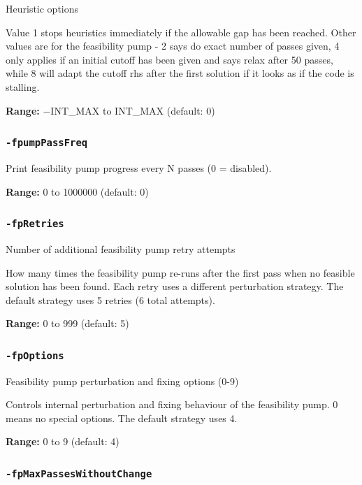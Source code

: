 \documentclass[11pt,a4paper]{article}
\begin{document}
Heuristic options

Value 1 stops heuristics immediately if the allowable gap has been reached. Other values are for the feasibility pump - 2 says do exact number of passes given, 4 only applies if an initial cutoff has been given and says relax after 50 passes, while 8 will adapt the cutoff rhs after the first solution if it looks as if the code is stalling.

\textbf{Range:} $-$INT\_MAX to INT\_MAX (default: 0)

\subsubsection*{\texttt{-fpumpPassFreq}}

Print feasibility pump progress every N passes (0 = disabled).

\textbf{Range:} 0 to 1000000 (default: 0)

\subsubsection*{\texttt{-fpRetries}}

Number of additional feasibility pump retry attempts

How many times the feasibility pump re-runs after the first pass when no feasible solution has been found. Each retry uses a different perturbation strategy. The default strategy uses 5 retries (6 total attempts).

\textbf{Range:} 0 to 999 (default: 5)

\subsubsection*{\texttt{-fpOptions}}

Feasibility pump perturbation and fixing options (0-9)

Controls internal perturbation and fixing behaviour of the feasibility pump. 0 means no special options. The default strategy uses 4.

\textbf{Range:} 0 to 9 (default: 4)

\subsubsection*{\texttt{-fpMaxPassesWithoutChange}}
\end{document}
